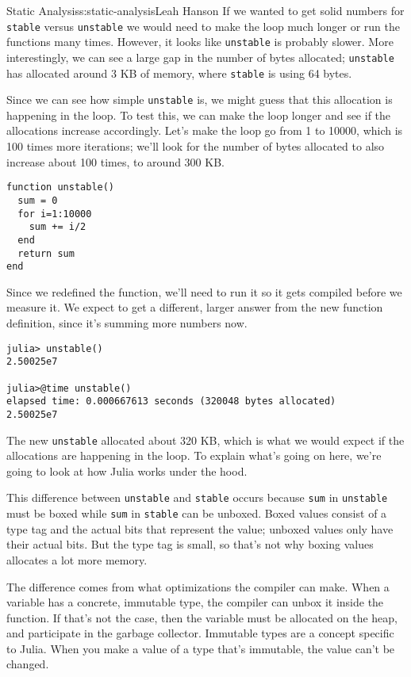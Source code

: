 \begin{aosachapter}{Static Analysis}{s:static-analysis}{Leah Hanson}
If we wanted to get solid numbers for \texttt{stable} versus
\texttt{unstable} we would need to make the loop much longer or run the
functions many times. However, it looks like \texttt{unstable} is
probably slower. More interestingly, we can see a large gap in the
number of bytes allocated; \texttt{unstable} has allocated around 3 KB
of memory, where \texttt{stable} is using 64 bytes.

Since we can see how simple \texttt{unstable} is, we might guess that
this allocation is happening in the loop. To test this, we can make the
loop longer and see if the allocations increase accordingly. Let's make
the loop go from 1 to 10000, which is 100 times more iterations; we'll
look for the number of bytes allocated to also increase about 100 times,
to around 300 KB.

\begin{verbatim}
function unstable()
  sum = 0
  for i=1:10000
    sum += i/2
  end
  return sum
end
\end{verbatim}

Since we redefined the function, we'll need to run it so it gets
compiled before we measure it. We expect to get a different, larger
answer from the new function definition, since it's summing more numbers
now.

\begin{verbatim}
julia> unstable()
2.50025e7

julia>@time unstable()
elapsed time: 0.000667613 seconds (320048 bytes allocated)
2.50025e7
\end{verbatim}

The new \texttt{unstable} allocated about 320 KB, which is what we would
expect if the allocations are happening in the loop. To explain what's
going on here, we're going to look at how Julia works under the hood.

This difference between \texttt{unstable} and \texttt{stable} occurs
because \texttt{sum} in \texttt{unstable} must be boxed while
\texttt{sum} in \texttt{stable} can be unboxed. Boxed values consist of
a type tag and the actual bits that represent the value; unboxed values
only have their actual bits. But the type tag is small, so that's not
why boxing values allocates a lot more memory.

The difference comes from what optimizations the compiler can make. When
a variable has a concrete, immutable type, the compiler can unbox it
inside the function. If that's not the case, then the variable must be
allocated on the heap, and participate in the garbage collector.
Immutable types are a concept specific to Julia. When you make a value
of a type that's immutable, the value can't be changed.


\end{aosachapter}
